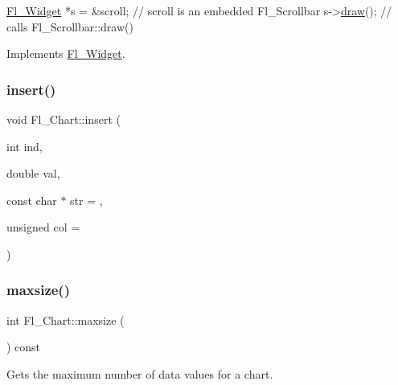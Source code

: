 \begin{DoxyCode}
    \hyperlink{class_fl___widget}{Fl\_Widget} *s = &scroll;     \textcolor{comment}{// scroll is an embedded Fl\_Scrollbar}
s->\hyperlink{class_fl___widget_a1acb38c6b3cb40452ad02ccfeedbac8a}{draw}();          \textcolor{comment}{// calls Fl\_Scrollbar::draw()}
\end{DoxyCode}
 

Implements \hyperlink{class_fl___widget_a1acb38c6b3cb40452ad02ccfeedbac8a}{Fl\+\_\+\+Widget}.

\mbox{\label{class_fl___chart_a089a59736fc83df0e3e635f666416b77}} 
\subsubsection{\texorpdfstring{insert()}{insert()}}
{\footnotesize\ttfamily void Fl\+\_\+\+Chart\+::insert (\begin{DoxyParamCaption}\item[{int}]{ind,  }\item[{double}]{val,  }\item[{const char $\ast$}]{str = {},  }\item[{unsigned}]{col = {} }\end{DoxyParamCaption})}

\mbox{\label{class_fl___chart_ac49f97d8e5e82eb1471b25408dc2aacc}} 
\subsubsection{\texorpdfstring{maxsize()}{maxsize()}\hspace{0.1cm}{\footnotesize\ttfamily [1/2]}}
{\footnotesize\ttfamily int Fl\+\_\+\+Chart\+::maxsize (\begin{DoxyParamCaption}{ }\end{DoxyParamCaption}) const\hspace{0.3cm}{\ttfamily [inline]}}

Gets the maximum number of data values for a chart. \mbox{\label{class_fl___chart_a832be1890035c531c103d34058e71ca1}} 
